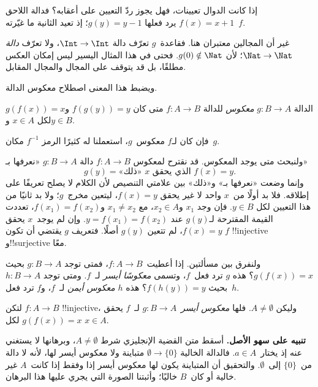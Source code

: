 \documentclass[../../../include/open-logic-section]{subfiles}
\begin{document}

\begin{explain}
إذا كانت الدوال تعيينات، فهل يجوز ردّ التعيين على أعقابه؟
فدالة اللاحق $f(x) = x + 1$ يرد فعلها $g(y) = y - 1$؛ إذ
تعيد الثانية ما غيّرته~$f$.

غير أن المجالين معتبران هنا. فقاعدة~$g$ تعرّف دالة
$\Int \to \Int$، ولا تعرّف \emph{دالة} $\Nat
\to \Nat$؛ لأن $g(0) \notin \Nat$. فحتى في هذا المثال اليسير
ليس إمكان العكس مطلقًا، بل قد يتوقف على المجال والمجال المقابل.

ويضبط هذا المعنى اصطلاح معكوس الدالة.
\end{explain}

\begin{defn}
الدالة $g \colon B \to A$ \emph{معكوس} للدالة $f
\colon A \to B$ متى كان $f(g(y)) = y$ و$g(f(x)) = x$ لكل
$x \in A$ و$y \in B$.
\end{defn}

فإن كان لـ$f$ معكوس~$g$، استعملنا له كثيرًا الرمز $f^{-1}$ مكان~$g$.

\begin{explain}
ولنبحث متى يوجد المعكوس. قد نقترح لمعكوس $f\colon A \to B$
دالة $g\colon B \to A$ «نعرفها بـ»
\[
g(y) = \text{«ذلك» $x$ الذي يحقق $f(x) = y$.}
\]
وإنما وضعت «نعرفها بـ» و«ذلك» بين علامتي التنصيص لأن الكلام
لا يصلح تعريفًا على إطلاقه. فلا بد أولًا من~$x$ واحد لا غير
يحقق $f(x) = y$، ليتعين مخرج~$g$؛ ولا بد ثانيًا من هذا التعيين
لكل $y \in B$. فإن وجد $x_1$ و$x_2 \in A$، مع $x_1 \neq x_2$
و$f(x_1) = f(x_2)$، تعددت القيمة المقترحة لـ$g(y)$ عند
$y = f(x_1) = f(x_2)$. وإن لم يوجد~$x$ يحقق $f(x) = y$،
لم تتعين $g(y)$ أصلًا. فتعريف $g$ يقتضي أن تكون $f$ !!{injective} و!!{surjective} معًا.

ولنفرق بين مسألتين. إذا أعطيت~$f\colon A \to B$، فمتى توجد
$g\colon B \to A$ بحيث $g(f(x)) = x$؟ هذه $g$ ترد فعل~$f$،
وتسمى \emph{معكوسًا أيسر} لـ~$f$. ومتى توجد $h\colon B \to A$
بحيث $f(h(y)) = y$؟ هذه $h$ \emph{معكوس أيمن} لـ~$f$،
و$f$ ترد فعل~$h$.
\end{explain}

\begin{prop}
لتكن $f\colon A \to B$ !!{injective}، وليكن $A \neq \emptyset$.
فلها \emph{معكوس أيسر}~$g\colon B \to A$ لـ~$f$ يحقق $g(f(x)) = x$
لكل $x \in A$.
\end{prop}

\begin{explain}
\textbf{تنبيه على سهو الأصل.} أسقط متن القضية الإنجليزي شرط
$A\neq\emptyset$، وبرهانها لا يستغني عنه إذ يختار~$a\in A$.
فالدالة الخالية $\emptyset\to\{0\}$ متباينة ولا معكوس أيسر لها،
لأنه لا دالة من~$\{0\}$ إلى~$\emptyset$. والتحقيق أن المتباينة
يكون لها معكوس أيسر إذا وفقط إذا كانت~$A$ غير خالية أو كان~$B$
خاليًا؛ وأثبتنا الصورة التي يجري عليها هذا البرهان.
\end{explain}
\end{document}
